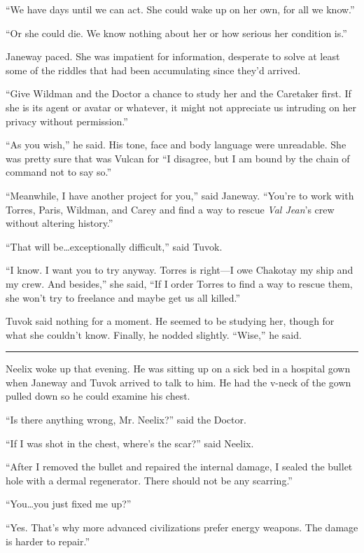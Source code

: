 \documentclass[twoside,letterpaper,12pt]{memoir}
\begin{document}
``We have days until we can act. She could wake up on her own, for all we know.'' 

``Or she could die. We know nothing about her or how serious her condition is.'' 

Janeway paced. She was impatient for information, desperate to solve at least some of the riddles that had been accumulating since they'd arrived. 

``Give Wildman and the Doctor a chance to study her and the Caretaker first. If she is its agent or avatar or whatever, it might not appreciate us intruding on her privacy without permission.'' 

``As you wish,'' he said. His tone, face and body language were unreadable. She was pretty sure that was Vulcan for ``I disagree, but I am bound by the chain of command not to say so.'' 

``Meanwhile, I have another project for you,'' said Janeway. ``You're to work with Torres, Paris, Wildman, and Carey and find a way to rescue \textit{Val Jean}'s crew without altering history.'' 

``That will be\ldots exceptionally difficult,'' said Tuvok. 

``I know. I want you to try anyway. Torres is right---I owe Chakotay my ship and my crew. And besides,'' she said, ``If I order Torres to find a way to rescue them, she won't try to freelance and maybe get us all killed.'' 

Tuvok said nothing for a moment. He seemed to be studying her, though for what she couldn't know. Finally, he nodded slightly. ``Wise,'' he said. 

\fancybreak{\rule{3cm}{0.4 pt}} 

Neelix woke up that evening. He was sitting up on a sick bed in a hospital gown when Janeway and Tuvok arrived to talk to him. He had the v-neck of the gown pulled down so he could examine his chest. 

``Is there anything wrong, Mr. Neelix?'' said the Doctor. 

``If I was shot in the chest, where's the scar?'' said Neelix. 

``After I removed the bullet and repaired the internal damage, I sealed the bullet hole with a dermal regenerator. There should not be any scarring.'' 

``You\ldots you just fixed me up?'' 

``Yes. That's why more advanced civilizations prefer energy weapons. The damage is harder to repair.'' 
\end{document}
